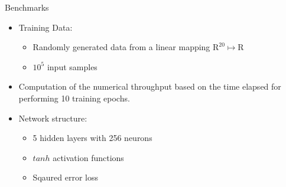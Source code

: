 \documentclass{beamer}
\begin{document}
\begin{frame}{Benchmarks}
  \begin{itemize}
    \item Training Data:
      \begin{itemize}
      \item Randomly generated data from a linear mapping
        $\mathrm{R}^{20} \mapsto \mathrm{R}$
      \item $10^5$ input samples
        \end{itemize}
       \item Computation of the numerical throughput based on the time elapsed
         for performing 10 training epochs.
      \item Network structure:
        \begin{itemize}
          \item 5 hidden layers with 256 neurons
          \item $tanh$ activation functions
          \item Sqaured error loss
          \end{itemize}
    \end{itemize}
\end{frame}

\end{document}
